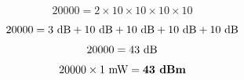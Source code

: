 $$20000 = 2 \times 10 \times 10 \times 10 \times 10$$

$$20000 = 3 \hbox{ dB} + 10 \hbox { dB} + 10 \hbox { dB} + 10 \hbox{ dB} + 10 \hbox { dB}$$

$$20000 = 43 \hbox{ dB}$$

$$20000 \times 1 \hbox{ mW}= \hbox{\bf 43 dBm}$$











